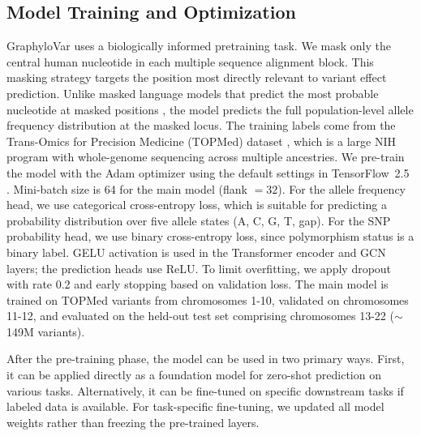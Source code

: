 \documentclass[unnumsec,webpdf,contemporary,large]{oup-authoring-template}%
\newcommand{\rev}[1]{{\color{red}#1}}
\theoremstyle{thmstyleone}%
\theoremstyle{thmstyletwo}%
\theoremstyle{thmstylethree}%
\begin{document}
\subsection{Model Training and Optimization}


GraphyloVar uses a biologically informed pretraining task. We mask only the central human nucleotide in each multiple sequence alignment block. This masking strategy targets the position most directly relevant to variant effect prediction. Unlike masked language models that predict the most probable nucleotide at masked positions \citep{ji2021dnabert, benegas2024gpnmsa}, the model predicts the full population-level allele frequency distribution at the masked locus. The training labels come from the Trans-Omics for Precision Medicine (TOPMed) dataset \citep{burgess2021topmed}, which is a large NIH program with whole-genome sequencing across multiple ancestries.
We pre-train the model with the Adam optimizer \citep{kingma2014adam} using the default settings in TensorFlow~2.5 \citep{tensorflow2015-whitepaper-short}. Mini-batch size is 64 for the main model (flank $= 32$). \rev{For the allele frequency head, we use categorical cross-entropy loss, which is suitable for predicting a probability distribution over five allele states (A, C, G, T, gap). For the SNP probability head, we use binary cross-entropy loss, since polymorphism status is a binary label.} GELU activation is used in the Transformer encoder and GCN layers; the prediction heads use ReLU. To limit overfitting, we apply dropout with rate 0.2 and early stopping based on validation loss. The main model is trained on TOPMed variants from chromosomes 1-10, validated on chromosomes 11-12, and evaluated on the held-out test set comprising chromosomes 13-22 ($\sim$149M variants).

After the pre-training phase, the model can be used in two primary ways. First, it can be applied directly as a foundation model for zero-shot prediction on various tasks. Alternatively, it can be fine-tuned on specific downstream tasks if labeled data is available. For task-specific fine-tuning, we updated all model weights rather than freezing the pre-trained layers.
\end{document}
